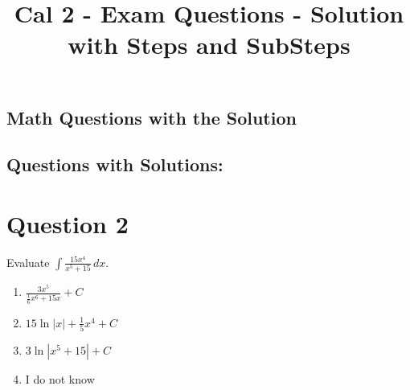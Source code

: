 \documentclass{article}
\title{\textbf{Cal 2 - Exam Questions - Solution with Steps and SubSteps }}
\author{}
\date{}
\begin{document}
\maketitle

\begin{center}
    \section*{Math Questions with the Solution}  
\end{center}

\subsection*{Questions with Solutions:}

    \section*{Question 2}
    Evaluate $\displaystyle\int\frac{15x^4}{x^5+15}\,dx$.  
    
    \begin{enumerate}[label = \alph*.]
        \item $\frac{3x^5}{\frac{1}{6}x^6+15x}+C$
        \item $15\ln|x|+\frac{1}{5}x^4+C$
        \item $3\ln|x^5+15|+C$
        \item I do not know
    \end{enumerate}
\end{document}
